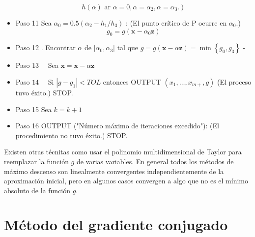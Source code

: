 \begin{itemize}
	$$
	h(\alpha) \text { ar } \left.\alpha=0, \alpha=\alpha_{2}, \alpha=\alpha_{3} .\right)
	$$
\item Paso 11 Sea $\alpha_{0}=0.5\left(\alpha_{2}-h_{1} / h_{3}\right)$ : (El punto crítico de P ocurre en $\alpha_{0}$.)
	$$
	g_{0}=g\left(\mathbf{x}-\alpha_{0} \mathbf{z}\right)
	$$
\item Paso 12 . Encontrar $\alpha$ de $\left|\alpha_{0}, \alpha_{3}\right|$ tal que $g=g(\mathbf{x}-\alpha \mathbf{z})=\min \left\{g_{0}, g_{3}\right\}$ - 
\item Paso $13 \quad$ Sea $\mathbf{x}=\mathbf{x}-\alpha \mathbf{z}$ \\
\item Paso $14 \quad$ Si $\left|g-g_{1}\right|<T O L$ entonces OUTPUT $\left(x_{1}, \ldots, x_{m+}, g\right)$ 
	(El proceso tuvo éxito.) STOP.
\item Paso 15 Sea $k=k+1$ 
\item Paso 16 OUTPUT ("Número máximo de iteraciones excedido"):
	(El procedimiento no tuvo éxito.) STOP.
\end{itemize}

Existen otras técnitas como usar el polinomio multidimensional de Taylor para reemplazar la función $g$ de varias variables. En general todos los métodos de máximo descenso son linealmente convergentes independientemente de la aproximación inicial, pero en algunos casos convergen a algo que no es el mínimo absoluto de la función $g$.

\section{Método del gradiente conjugado}




